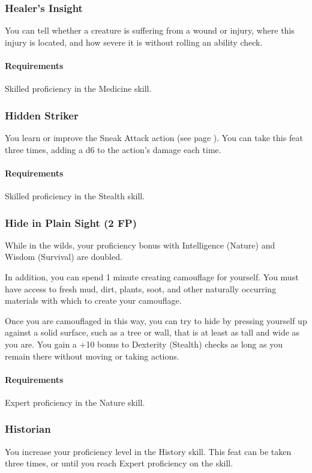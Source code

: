 \subsubsection{Healer's Insight} \label{feat::healersinsight}
    You can tell whether a creature is suffering from a wound or injury, where this injury is located, and how severe it is without rolling an ability check.
    \paragraph{Requirements} Skilled proficiency in the Medicine skill.
\subsubsection{Hidden Striker} \label{feat::hiddenstriker}
    You learn or improve the Sneak Attack action (see page \pageref{act:sneakattack}).
    You can take this feat three times, adding a d6 to the action's damage each time.
    \paragraph{Requirements} Skilled proficiency in the Stealth skill.
\subsubsection{Hide in Plain Sight (2 FP)} \label{feat::hideinplainsight}
    While in the wilds, your proficiency bonus with Intelligence (Nature) and Wisdom (Survival) are doubled.

    In addition, you can spend 1 minute creating camouflage for yourself.
    You must have access to fresh mud, dirt, plants, soot, and other naturally occurring materials with which to create your camouflage.

    Once you are camouflaged in this way, you can try to hide by pressing yourself up against a solid surface, such as a tree or wall, that is at least as tall and wide as you are.
    You gain a +10 bonus to Dexterity (Stealth) checks as long as you remain there without moving or taking actions.
    \paragraph{Requirements} Expert proficiency in the Nature skill.
\subsubsection{Historian} \label{feat::historian}
    You increase your proficiency level in the History skill.
    This feat can be taken three times, or until you reach Expert proficiency on the skill.
